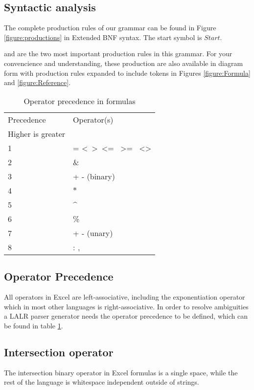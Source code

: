 \documentclass[conference]{IEEEtran}
\begin{document}
\subsection{Syntactic analysis}
\label{subsection:productionRules}

The complete production rules of our grammar can be found in Figure \ref{figure:productions} in Extended BNF syntax.
The start symbol is $Start$.

 and  are the two most important production rules in this grammar.
For your convencience and understanding, these production are also available in diagram form with production rules expanded to include tokens in Figures \ref{figure:Formula} and \ref{figure:Reference}.

\begin{table}
\caption{Operator precedence in formulas}
\label{table:operatorprec}
\begin{tabular}{ll}
Precedence & Operator(s) \\
Higher is greater & \\
1 & = \textless \  \textgreater \  \textless= \  \textgreater= \  \textless\textgreater          \\
2 & \&  \\
3 & + - (binary) \\
4 & $\ast$ \\
5 & \textasciicircum \\
6 & \% \\
7 & + - (unary) \\
8 & : , \texttt{\char32}
\end{tabular}
\end{table}

\subsection{Operator Precedence}
\label{sec:operatorprecedence}

All operators in Excel are left-associative, including the exponentiation operator which in most other languages is right-associative.
In order to resolve ambiguities a LALR parser generator needs the operator precedence to be defined, which can be found in table \ref{table:operatorprec}.

\subsection{Intersection operator}

The intersection binary operator in Excel formulas is a single space, while the rest of the language is whitespace independent outside of strings.
\end{document}
